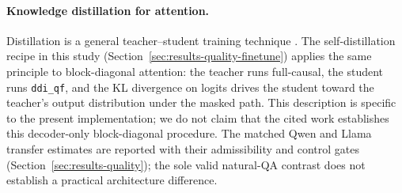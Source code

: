 \paragraph{Knowledge distillation for attention.}
Distillation is a general teacher--student training technique
\citep{sanh2020distilbert}. The self-distillation recipe in this study
(Section~\ref{sec:results-quality-finetune}) applies the same principle
to block-diagonal attention: the teacher runs full-causal, the student
runs \texttt{ddi\_qf}, and the KL divergence on logits drives the
student toward the teacher's output distribution under the masked path. This
description is specific to the present implementation; we do not claim that
the cited work establishes this decoder-only block-diagonal procedure.
The matched Qwen and Llama transfer estimates are reported with their
admissibility and control gates (Section~\ref{sec:results-quality}); the sole
valid natural-QA contrast does not establish a practical architecture
difference.
